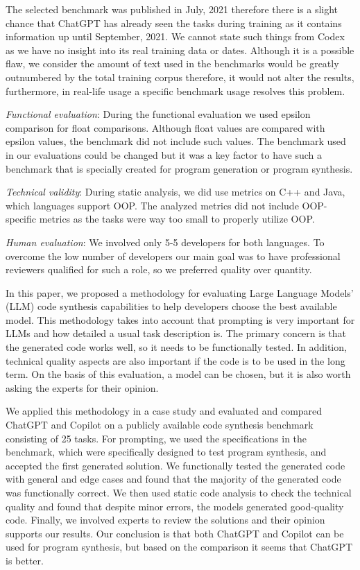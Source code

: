 The selected benchmark was published in July, 2021 therefore there is a slight chance that ChatGPT has already seen the tasks during training as it contains information up until September, 2021.
We cannot state such things from Codex as we have no insight into its real training data or dates.
Although it is a possible flaw, we consider the amount of text used in the benchmarks would be greatly outnumbered by the total training corpus therefore, it would not alter the results, furthermore, in real-life usage a specific benchmark usage resolves this problem.

\textit{Functional evaluation}: During the functional evaluation we used epsilon comparison for float comparisons.
Although float values are compared with epsilon values, the benchmark did not include such values.
The benchmark used in our evaluations could be changed but it was a key factor to have such a benchmark that is specially created for program generation or program synthesis.

\textit{Technical validity}: During static analysis, we did use metrics on C++ and Java, which languages support OOP.
The analyzed metrics did not include OOP-specific metrics as the tasks were way too small to properly utilize OOP.

\textit{Human evaluation}: We involved only 5-5 developers for both languages.
To overcome the low number of developers our main goal was to have professional reviewers qualified for such a role, so we preferred quality over quantity.
\label{l:summary}


In this paper, we proposed a methodology for evaluating Large Language Models' (LLM) code synthesis capabilities to help developers choose the best available model.
This methodology takes into account that prompting is very important for LLMs and how detailed a usual task description is.
The primary concern is that the generated code works well, so it needs to be functionally tested. In addition, technical quality aspects are also important if the code is to be used in the long term. On the basis of this evaluation, a model can be chosen, but it is also worth asking the experts for their opinion.

We applied this methodology in a case study and evaluated and compared ChatGPT and Copilot on a publicly available code synthesis benchmark consisting of 25 tasks.
For prompting, we used the specifications in the benchmark, which were specifically designed to test program synthesis, and accepted the first generated solution.
We functionally tested the generated code with general and edge cases and found that the majority of the generated code was functionally correct.
We then used static code analysis to check the technical quality and found that despite minor errors, the models generated good-quality code.
Finally, we involved experts to review the solutions and their opinion supports our results.
Our conclusion is that both ChatGPT and Copilot can be used for program synthesis, but based on the comparison it seems that ChatGPT is better.

